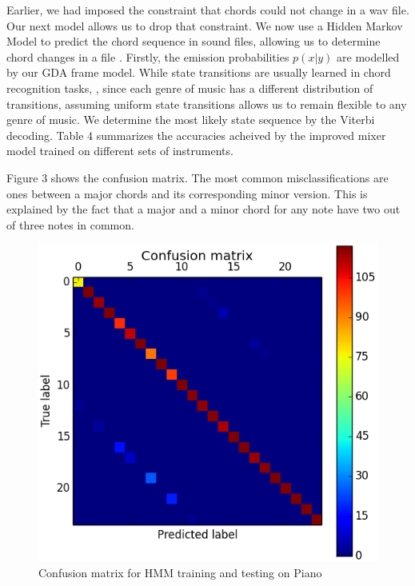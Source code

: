 \documentclass{article}
\begin{document}
Earlier, we had imposed the constraint that chords could not change in a wav
file. Our next model allows us to drop that constraint. We now use a Hidden
Markov Model to predict the chord sequence in sound files, allowing us to
determine chord changes in a file \cite{lee}. Firstly, the emission
probabilities $p(x|y)$ are modelled by our GDA frame model. While state
transitions are usually learned in chord recognition tasks, \cite{lee}, since
each genre of music has a different distribution of transitions, assuming
uniform state transitions allows us to remain flexible to any genre of music. We
determine the most likely state sequence by the Viterbi decoding. Table 4
summarizes the accuracies acheived by the improved mixer model trained on
different sets of instruments.

Figure 3 shows the confusion matrix. The most common misclassifications are ones
between a major chords and its corresponding minor version. This is explained by
the fact that a major and a minor chord for any note have two out of three notes
in common.

\begin{figure}[ht]
\vskip 0.2in
\begin{center}
\centerline{\includegraphics[width=\columnwidth]{conf}}
\caption{Confusion matrix for HMM training and testing on Piano}
\label{icml-historical}
\end{center}
\vskip -0.2in
\end{figure}
\end{document}
